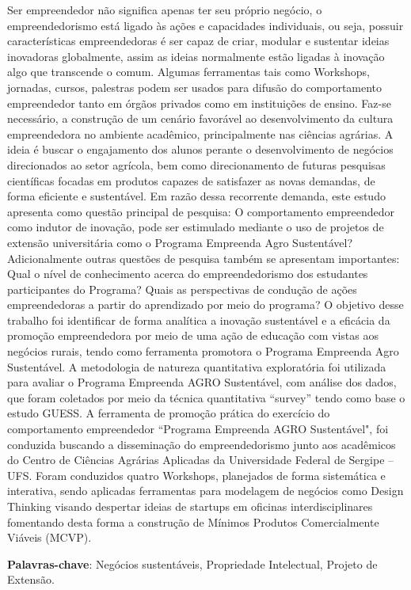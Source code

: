 \setlength{\absparsep}{18pt} %
\begin{resumo}


Ser empreendedor não significa apenas ter seu próprio negócio, o empreendedorismo está ligado às ações e capacidades individuais, ou seja, possuir características empreendedoras é ser capaz de criar, modular e sustentar ideias inovadoras globalmente, assim as ideias normalmente estão ligadas à inovação algo que transcende o comum. Algumas ferramentas tais como Workshops, jornadas, cursos, palestras podem ser usados para difusão do comportamento empreendedor tanto em órgãos privados como em instituições de ensino. Faz-se necessário, a construção de um cenário favorável ao desenvolvimento da cultura empreendedora no ambiente acadêmico, principalmente nas ciências agrárias. A ideia é buscar o engajamento dos alunos perante o desenvolvimento de negócios direcionados ao setor agrícola, bem como direcionamento de futuras pesquisas científicas focadas em produtos capazes de satisfazer as novas demandas, de forma eficiente e sustentável. Em razão dessa recorrente demanda, este estudo apresenta como questão principal de pesquisa: O comportamento empreendedor como indutor de inovação, pode ser estimulado mediante o uso de projetos de extensão universitária como o Programa Empreenda Agro Sustentável? Adicionalmente outras questões de pesquisa também se apresentam importantes: Qual o nível de conhecimento acerca do empreendedorismo dos estudantes participantes do Programa? Quais as perspectivas de condução de ações empreendedoras a partir do aprendizado por meio do programa? O objetivo desse trabalho foi identificar de forma analítica a inovação sustentável e a eficácia da promoção empreendedora por meio de uma ação de educação com vistas aos negócios rurais, tendo como ferramenta promotora o Programa Empreenda Agro Sustentável. A metodologia de natureza quantitativa exploratória foi utilizada para avaliar o Programa Empreenda AGRO
Sustentável, com análise dos dados, que foram coletados por meio da técnica quantitativa 
“survey” tendo como base o estudo GUESS. A ferramenta de promoção prática do exercício do comportamento empreendedor “Programa Empreenda AGRO Sustentável", foi conduzida buscando a disseminação do empreendedorismo junto aos acadêmicos do Centro de Ciências Agrárias Aplicadas da Universidade Federal de Sergipe – UFS. Foram conduzidos quatro Workshops, planejados de forma sistemática e interativa, sendo aplicadas ferramentas para modelagem de negócios como Design Thinking visando despertar ideias de startups em oficinas interdisciplinares fomentando desta forma a construção de Mínimos Produtos Comercialmente Viáveis (MCVP).


 \textbf{Palavras-chave}: Negócios sustentáveis, Propriedade Intelectual, Projeto de Extensão.
\end{resumo}